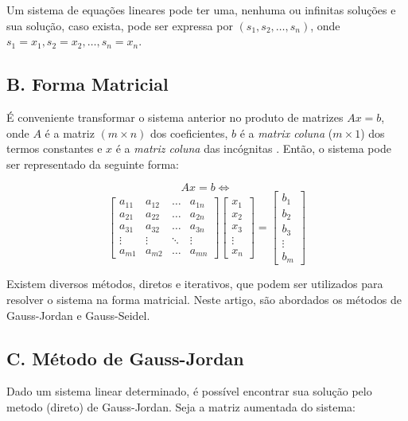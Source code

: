\documentclass[twocolumn, 10pt,a4paper]{extarticle}
\begin{document}
Um sistema de equações lineares pode ter uma, nenhuma ou infinitas soluções \cite[p. 4]{antonAlgebra} e sua solução, caso exista, pode ser expressa por $(s_1, s_2,\dots, s_n)$, onde $s_1 = x_1, s_2 = x_2, \dots, s_n = x_n$.

\subsection*{B. \quad Forma Matricial}

É conveniente transformar o sistema anterior no produto de matrizes $Ax = b$, onde $A$ é a matriz $(m \times n)$ dos coeficientes, $b$ é a \textit{matrix coluna} ($m \times 1$) dos termos constantes e $x$ é a \textit{matriz coluna} das incógnitas \cite[p. 33]{antonAlgebra}. Então, o sistema pode ser representado da seguinte forma:

\[Ax = b \iff\]
\[ 
\begin{bmatrix}
a_{11} & a_{12} & \dots & a_{1n} \\
a_{21} & a_{22} & \dots & a_{2n} \\
a_{31} & a_{32} & \dots & a_{3n} \\
\vdots & \vdots & \ddots & \vdots \\
a_{m1} & a_{m2} & \dots & a_{mn}  
\end{bmatrix}
\begin{bmatrix}
x_{1}\\
x_{2}\\
x_{3}\\
\vdots\\
x_{n}
\end{bmatrix}
=
\begin{bmatrix}
b_{1}\\
b_{2}\\
b_{3}\\
\vdots\\
b_{m}
\end{bmatrix}
\]

Existem diversos métodos, diretos e iterativos, que podem ser utilizados para resolver o sistema na forma matricial. Neste artigo, são abordados os métodos de Gauss-Jordan e Gauss-Seidel.

\subsection*{C. \quad Método de Gauss-Jordan}

Dado um sistema linear determinado, é possível encontrar sua solução pelo metodo (direto) de Gauss-Jordan. Seja a matriz aumentada do sistema:
\end{document}
